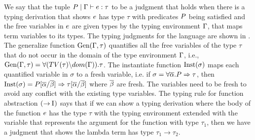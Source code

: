 \documentclass[format=acmsmall,manuscript,review,screen,nonacm,margin=1in,11pt]{acmart}
\begin{document}
We say that the tuple $P \mid \Gamma \vdash e : \tau$ to be a judgment
that holds when there is a typing derivation that shows $e$ has type $\tau$
with predicates $P$ being satisfied and the free variables in $e$
are given types by the typing environment $\Gamma$, that maps term variables to its types.
The typing judgments for the language are shown in .
The generalize function $\text{Gen}(\Gamma, \tau)$ quantifies
all the free variables of the type $\tau$ that do not occur in the domain
of the type environment $\Gamma$, i.e., $\text{Gen}(\Gamma, \tau) = \forall(TV(\tau)\backslash dom(\Gamma)).\tau$.
The instantiate function $\text{Inst}(\sigma)$ maps each quantified variable in $\sigma$ to a
fresh variable, i.e. if $\sigma=\forall\overline{\alpha}.P\Rightarrow\tau$,
then $\text{Inst}(\sigma) = P[\overline{\alpha}/\overline{\beta}]\Rightarrow\tau[\overline{\alpha}/\overline{\beta}]$
where $\overline{\beta}$ are fresh. The variables need to be fresh to avoid
any conflict with the existing type variables. The typing rule
for function abstraction $\textsc{(\ensuremath{\mathord{\to}}\!~I)}$ says that if we can show a typing derivation
where the body of the function $e$ has the type $\tau$ with the typing environment
extended with the variable that represents the argument for the function with type $\tau_1$,
then we have a judgment that shows the lambda term
has type $\tau_1\to\tau_2$.

\newcommand\TAbs{
  \ib{\irule[\trule{t-abs}]
    {\QTyping \Preds {\TEnv, x\co\tau_1} {\Tm} {\tau}};
    {\QTyping \Preds \TEnv {\Lam x {\tau_1} \Tm} {\tau_1 \to \tau}}}
}
 
\newcommand\TApp{
  \ib{\irule[\trule{t-app}]
    {\QTyping \Preds \TEnv {\Tm_1} {\tau_2 \to \tau}}
    {\QTyping \Preds \TEnv {\Tm_2} {\tau_2}};
    {\QTyping \Preds \TEnv {\Tm_1\App\Tm_2} {\tau}}}
}

\newcommand\TLet{\ib{\irule[\trule{t-let}]
  {\QTyping \Preds {\TEnv} {\Tm_1} \tau_1}
  {\sigma = \Gen \TEnv {\Preds\then\tau_1}}
  {\QTyping {\Preds_1} {\TEnv, x\co\sigma} {\Tm_2} \tau_2};
  {\QTyping {\Preds_1} \TEnv {\Let x {\Tm_1} {\Tm_2}} \tau_2}}
}
\end{document}
